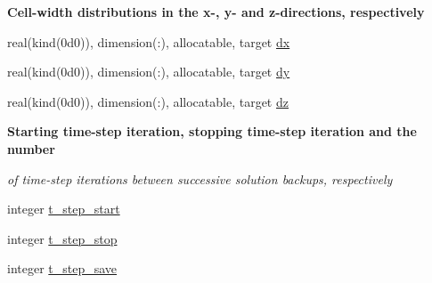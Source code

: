\begin{Indent}\textbf{ Cell-\/width distributions in the x-\/, y-\/ and z-\/directions, respectively}\par
\begin{DoxyCompactItemize}
\item 
real(kind(0d0)), dimension(\+:), allocatable, target \hyperlink{namespacem__global__parameters_af7508eba0a53c9a35913a502d58dfb54}{dx}
\item 
real(kind(0d0)), dimension(\+:), allocatable, target \hyperlink{namespacem__global__parameters_adc2bc27e809a773b7f5a6a65edac3b89}{dy}
\item 
real(kind(0d0)), dimension(\+:), allocatable, target \hyperlink{namespacem__global__parameters_a04878814b8097100a179152ba853262a}{dz}
\end{DoxyCompactItemize}
\end{Indent}
\begin{Indent}\textbf{ Starting time-\/step iteration, stopping time-\/step iteration and the number}\par
{\em of time-\/step iterations between successive solution backups, respectively }\begin{DoxyCompactItemize}
\item 
integer \hyperlink{namespacem__global__parameters_ace0c8a67825d0dccd2e23b5d0f9985c0}{t\+\_\+step\+\_\+start}
\item 
integer \hyperlink{namespacem__global__parameters_aff1140575af25247060f3e7f31a8a10f}{t\+\_\+step\+\_\+stop}
\item 
integer \hyperlink{namespacem__global__parameters_a98b51eda2c46660b439c0a8375385165}{t\+\_\+step\+\_\+save}
\end{DoxyCompactItemize}
\end{Indent}
